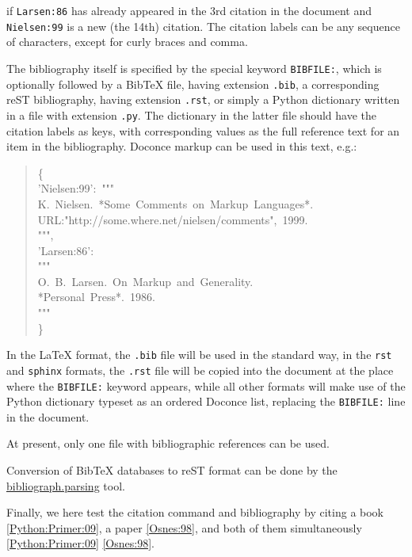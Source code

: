 \documentclass[a4paper]{article}
\begin{document}
if \texttt{Larsen:86} has already appeared in the 3rd citation in the document
and \texttt{Nielsen:99} is a new (the 14th) citation. The citation labels
can be any sequence of characters, except for curly braces and comma.

The bibliography itself is specified by the special keyword \texttt{BIBFILE:},
which is optionally followed by a BibTeX file, having extension \texttt{.bib},
a corresponding reST bibliography, having extension \texttt{.rst},
or simply a Python dictionary written in a file with extension \texttt{.py}.
The dictionary in the latter file should have the citation labels as
keys, with corresponding values as the full reference text for an item
in the bibliography. Doconce markup can be used in this text, e.g.:
%
\begin{quote}{\ttfamily \raggedright \noindent
\{\\
'Nielsen:99':~"{}"{}"\\
K.~Nielsen.~*Some~Comments~on~Markup~Languages*.\\
URL:"http://some.where.net/nielsen/comments",~1999.\\
"{}"{}",\\
'Larsen:86':\\
"{}"{}"\\
O.~B.~Larsen.~On~Markup~and~Generality.\\
*Personal~Press*.~1986.\\
"{}"{}"\\
\}
}
\end{quote}

In the LaTeX format, the \texttt{.bib} file will be used in the standard way,
in the \texttt{rst} and \texttt{sphinx} formats, the \texttt{.rst} file will be
copied into the document at the place where the \texttt{BIBFILE:} keyword
appears, while all other formats will make use of the Python dictionary
typeset as an ordered Doconce list, replacing the \texttt{BIBFILE:} line
in the document.

At present, only one file with bibliographic references can be used.



Conversion of BibTeX databases to reST format can be
done by the \href{http://pypi.python.org/pypi/bibliograph.parsing/}{bibliograph.parsing} tool.

Finally, we here test the citation command and bibliography by
citing a book \hyperlink{python-primer-09}{[Python:Primer:09]}, a paper \hyperlink{osnes-98}{[Osnes:98]},
and both of them simultaneously \hyperlink{python-primer-09}{[Python:Primer:09]} \hyperlink{osnes-98}{[Osnes:98]}.
\end{document}
